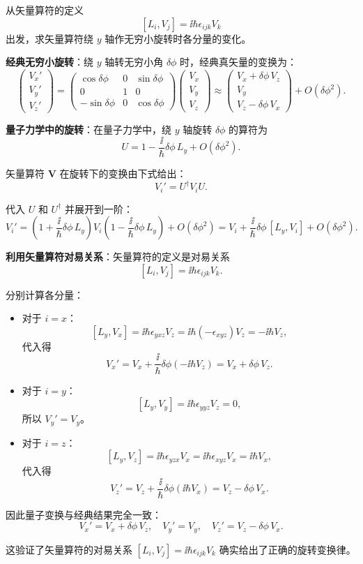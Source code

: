\begin{question}
从矢量算符的定义
\[
[L_i,V_j]=\ii\hbar\epsilon_{ijk}V_k
\]
出发，求矢量算符绕 $y$ 轴作无穷小旋转时各分量的变化。
\end{question}
\begin{solution}
	\textbf{经典无穷小旋转}：绕 $y$ 轴转无穷小角 $\delta\phi$ 时，经典真矢量的变换为：
	\[
	\begin{pmatrix}V_x'\\V_y'\\V_z'\end{pmatrix}
	= \begin{pmatrix}\cos\delta\phi&0&\sin\delta\phi\\0&1&0\\-\sin\delta\phi&0&\cos\delta\phi\end{pmatrix}
	\begin{pmatrix}V_x\\V_y\\V_z\end{pmatrix}
	\approx \begin{pmatrix}V_x + \delta\phi\,V_z\\V_y\\V_z - \delta\phi\,V_x\end{pmatrix}+O(\delta\phi^2).
	\]

	\textbf{量子力学中的旋转}：在量子力学中，绕 $y$ 轴旋转 $\delta\phi$ 的算符为
	\[
	U = 1 - \frac{\ii}{\hbar}\delta\phi\,L_y + O(\delta\phi^2).
	\]

	矢量算符 $\mathbf V$ 在旋转下的变换由下式给出：
	\[
	V_i' = U^\dagger V_i U.
	\]

	代入 $U$ 和 $U^\dagger$ 并展开到一阶：
	\[
	V_i' = \left(1+\frac{\ii}{\hbar}\delta\phi\,L_y\right) V_i \left(1-\frac{\ii}{\hbar}\delta\phi\,L_y\right) + O(\delta\phi^2)
	= V_i + \frac{\ii}{\hbar}\delta\phi\,[L_y,V_i] + O(\delta\phi^2).
	\]

	\textbf{利用矢量算符对易关系}：矢量算符的定义是对易关系
	\[
	[L_i,V_j] = \ii\hbar\epsilon_{ijk}V_k.
	\]

	分别计算各分量：
	\begin{itemize}
	\item 对于 $i=x$：
	\[
	[L_y,V_x] = \ii\hbar\epsilon_{yxz}V_z = \ii\hbar(-\epsilon_{xyz})V_z = -\ii\hbar V_z,
	\]
	代入得
	\[
	V_x' = V_x + \frac{\ii}{\hbar}\delta\phi(-\ii\hbar V_z) = V_x + \delta\phi\,V_z.
	\]

	\item 对于 $i=y$：
	\[
	[L_y,V_y] = \ii\hbar\epsilon_{yyz}V_z = 0,
	\]
	所以 $V_y' = V_y$。

	\item 对于 $i=z$：
	\[
	[L_y,V_z] = \ii\hbar\epsilon_{yzx}V_x = \ii\hbar\epsilon_{xyz}V_x = \ii\hbar V_x,
	\]
	代入得
	\[
	V_z' = V_z + \frac{\ii}{\hbar}\delta\phi(\ii\hbar V_x) = V_z - \delta\phi\,V_x.
	\]
	\end{itemize}

	因此量子变换与经典结果完全一致：
	\[
	\boxed{V_x' = V_x + \delta\phi\,V_z,\quad V_y' = V_y,\quad V_z' = V_z - \delta\phi\,V_x}.
	\]

	这验证了矢量算符的对易关系 $[L_i,V_j]=\ii\hbar\epsilon_{ijk}V_k$ 确实给出了正确的旋转变换律。
	\end{solution}

